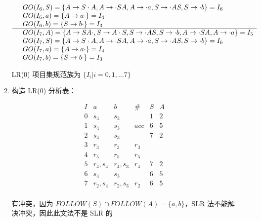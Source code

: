 \begin{enumerate}
\begin{enumerate}
\begin{equation*}
\begin{array}{cl}
                    & GO(I_6, S) = \{A \to S \cdot A, A \to \cdot SA, A \to \cdot a, S \to \cdot AS, S \to \cdot b \} = I_6 \\
                    & GO(I_6, a) = \{A \to a \cdot\} = I_4 \\
                    & GO(I_6, b) = \{S \to b \cdot\} = I_3 \\
                \hline
                    & GO(I_7, A) = \{A \to SA \cdot, S \to A \cdot S, S \to \cdot AS, S \to \cdot b, A \to \cdot SA, A \to \cdot a\} = I_5 \\
                    & GO(I_7, S) = \{A \to S \cdot A, A \to \cdot SA, A \to \cdot a, S \to \cdot AS, S \to \cdot b\} = I_6 \\
                    & GO(I_7, a) = \{A \to a \cdot\} = I_4 \\
                    & GO(I_7, b) = \{S \to b \cdot\} = I_3 \\
            \end{array}
        \end{equation*}
        
        LR(0) 项目集规范族为 $\{I_i | i = 0, 1, \dots 7\}$
        
        \item
        
        构造 LR(0) 分析表：
        
        \begin{equation*}
            \begin{array}{c|ccc|cc}
                I & a & b & \# & S & A \\
                \hline
                0 & s_4 & s_3 & & 1 & 2 \\
                1 & s_4 & s_3 & acc & 6 & 5 \\
                2 & s_4 & s_3 & & 7 & 2 \\
                3 & r_3 & r_3 & r_3 & & \\
                4 & r_5 & r_5 & r_5 & & \\
                5 & r_4, s_4 & r_4, s_3 & r_4 & 7 & 2 \\
                6 & s_4 & s_3 & & 6 & 5 \\
                7 & r_2, s_4 & r_2, s_3 & r_2 & 6 & 5\\
            \end{array}
        \end{equation*}
        
        有冲突，因为 $FOLLOW(S) \cap FOLLOW(A) = \{a, b\}$，SLR 法不能解决冲突，因此此文法不是 SLR 的
    

\end{enumerate}
\end{enumerate}
